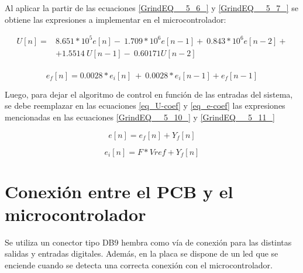 \noindent Al aplicar la partir de las ecuaciones \ref{GrindEQ__5_6_} y \ref{GrindEQ__5_7_} se obtiene las expresiones a implementar en el microcontrolador:

\begin{equation} 
	\begin{aligned}\label{eq_U-coef}
	U[n]=&8.651*10^5e[n]-\ 1.709*10^6e[n-1]+\ 0.843*10^6e[n-2]+\\
		 &+1.5514\ U[n-1]-\ 0.60171U[n-2]\\ 
	\end{aligned}
\end{equation}

\begin{equation} \label{eq_e-coef} 
	e_f[n]=0.0028*e_i[n]\ +\ {0.0028*e}_i[n-1]+e_f[n-1] 
\end{equation} 


\noindent Luego, para dejar el algoritmo de control en funci\'{o}n de las entradas del sistema, se debe reemplazar en las ecuaciones \ref{eq_U-coef} y \ref{eq_e-coef} las expresiones mencionadas en las ecuaciones \ref{GrindEQ__5_10_} y \ref{GrindEQ__5_11_}

\begin{equation} \label{GrindEQ__5_10_} 
	e[n]=e_f[n]+Y_f[n] 
\end{equation} 

\begin{equation} \label{GrindEQ__5_11_} 
	e_i[n]=F*Vref+Y_f[n] 
\end{equation} 

\section{Conexi\'{o}n entre el PCB y el microcontrolador}

\noindent Se utiliza un conector tipo DB9 hembra como v\'{i}a de conexi\'{o}n para las distintas salidas y entradas digitales. Adem\'{a}s, en la placa se dispone de un led que se enciende cuando  se detecta una correcta conexi\'{o}n con el microcontrolador.







